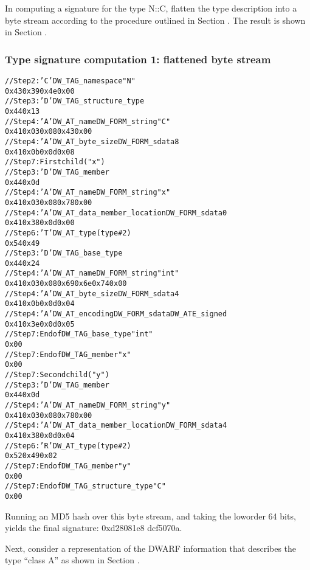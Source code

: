 In computing a signature for the type N::C, flatten the type
description into a byte stream according to the procedure
outlined in 
Section .
The result is shown in 
Section .

\subsubsection{Type signature  computation 1: flattened byte stream}
\label{app:typesignaturecomputation1flattenedbytestream}

\begin{alltt}
// Step 2: 'C' DW\_TAG\_namespace "N"
0x43 0x39 0x4e 0x00
// Step 3: 'D' DW\_TAG\_structure\_type
0x44 0x13
// Step 4: 'A' DW\_AT\_name DW\_FORM\_string "C"
0x41 0x03 0x08 0x43 0x00
// Step 4: 'A' DW\_AT\_byte\_size DW\_FORM\_sdata 8
0x41 0x0b 0x0d 0x08
// Step 7: First child ("x")
    // Step 3: 'D' DW\_TAG\_member
    0x44 0x0d
    // Step 4: 'A' DW\_AT\_name DW\_FORM\_string "x"
    0x41 0x03 0x08 0x78 0x00
    // Step 4: 'A' DW\_AT\_data\_member\_location DW\_FORM\_sdata 0
    0x41 0x38 0x0d 0x00
    // Step 6: 'T' DW\_AT\_type (type \#2)
    0x54 0x49
        // Step 3: 'D' DW\_TAG\_base\_type
        0x44 0x24
        // Step 4: 'A' DW\_AT\_name DW\_FORM\_string "int"
        0x41 0x03 0x08 0x69 0x6e 0x74 0x00
        // Step 4: 'A' DW\_AT\_byte\_size DW\_FORM\_sdata 4
        0x41 0x0b 0x0d 0x04
        // Step 4: 'A' DW\_AT\_encoding DW\_FORM\_sdata DW\_ATE\_signed
        0x41 0x3e 0x0d 0x05
        // Step 7: End of DW\_TAG\_base\_type "int"
        0x00
    // Step 7: End of DW\_TAG\_member "x"
    0x00
// Step 7: Second child ("y")
    // Step 3: 'D' DW\_TAG\_member
    0x44 0x0d
    // Step 4: 'A' DW\_AT\_name DW\_FORM\_string "y"
    0x41 0x03 0x08 0x78 0x00
    // Step 4: 'A' DW\_AT\_data\_member\_location DW\_FORM\_sdata 4
    0x41 0x38 0x0d 0x04
    // Step 6: 'R' DW\_AT\_type (type \#2)
    0x52 0x49 0x02
    // Step 7: End of DW\_TAG\_member "y"
    0x00
// Step 7: End of DW\_TAG\_structure\_type "C"
0x00
\end{alltt}

Running an MD5 hash over this byte stream, and taking the
low\dash order 64 bits, yields the final signature: 
0xd28081e8 dcf5070a.

Next, consider a representation of the DWARF information that
describes the type ``class A'' as shown in 
Section .


